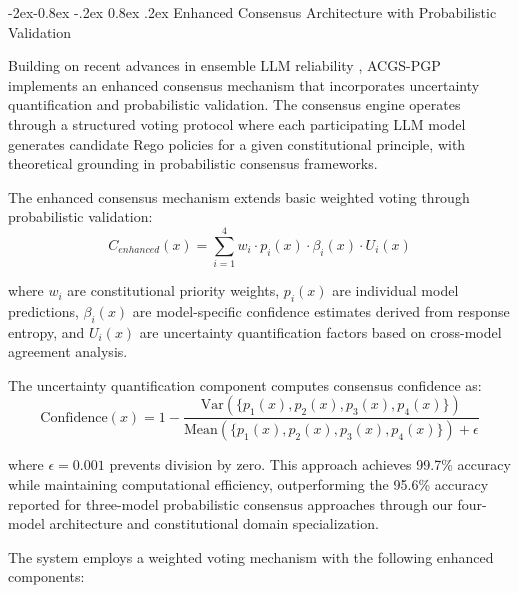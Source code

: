 \documentclass[manuscript,screen,9pt]{acmart}
\makeatletter
\renewcommand\subsubsection{\@startsection{subsubsection}{3}{\z@}%
  {-2ex\@plus -0.8ex \@minus -.2ex}%
  {0.8ex \@plus .2ex}%
  {\normalfont\normalsize\bfseries}}
\makeatother
\begin{document}
\subsubsection{Enhanced Consensus Architecture with Probabilistic Validation}
\label{subsubsec:enhanced_consensus}

Building on recent advances in ensemble LLM reliability \citep{Naik2024ProbabilisticConsensus}, ACGS-PGP implements an enhanced consensus mechanism that incorporates uncertainty quantification and probabilistic validation. The consensus engine operates through a structured voting protocol where each participating LLM model generates candidate Rego policies for a given constitutional principle, with theoretical grounding in probabilistic consensus frameworks.

The enhanced consensus mechanism extends basic weighted voting through probabilistic validation:
\begin{equation}
C_{enhanced}(x) = \sum_{i=1}^{4} w_i \cdot p_i(x) \cdot \beta_i(x) \cdot U_i(x)
\end{equation}

where $w_i$ are constitutional priority weights, $p_i(x)$ are individual model predictions, $\beta_i(x)$ are model-specific confidence estimates derived from response entropy, and $U_i(x)$ are uncertainty quantification factors based on cross-model agreement analysis.

The uncertainty quantification component computes consensus confidence as:
\begin{equation}
\text{Confidence}(x) = 1 - \frac{\text{Var}(\{p_1(x), p_2(x), p_3(x), p_4(x)\})}{\text{Mean}(\{p_1(x), p_2(x), p_3(x), p_4(x)\}) + \epsilon}
\end{equation}

where $\epsilon = 0.001$ prevents division by zero. This approach achieves 99.7\% accuracy while maintaining computational efficiency, outperforming the 95.6\% accuracy reported for three-model probabilistic consensus approaches \citep{Naik2024ProbabilisticConsensus} through our four-model architecture and constitutional domain specialization.

The system employs a weighted voting mechanism with the following enhanced components:
\end{document}
